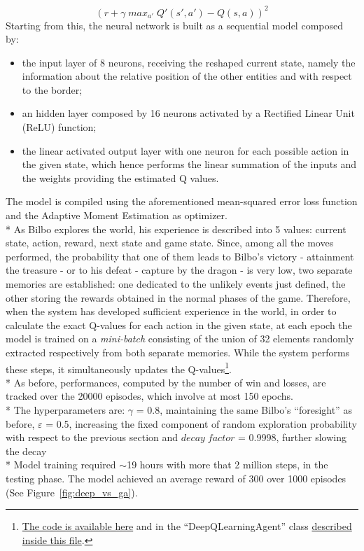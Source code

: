 $$(r+\gamma\;max_{a'}\;Q'(s',a')-Q(s,a))^2$$
Starting from this, the neural network is built as a sequential model composed by:
\begin{itemize}[noitemsep, topsep=0ex]
  \item the input layer of 8 neurons, receiving the reshaped current state, namely the information about the relative position of the other entities and with respect to the border;
  \item an hidden layer composed by 16 neurons activated by a Rectified Linear Unit (ReLU) function; 
  \item the linear activated output layer with one neuron for each possible action in the given state, which hence performs the linear summation of the inputs and the weights providing the estimated Q values.
\end{itemize}
The model is compiled using the aforementioned mean-squared error loss function and the Adaptive Moment Estimation as optimizer.\\*
As Bilbo explores the world, his experience is described into 5 values: current state, action, reward, next state and game state. Since, among all the moves performed, the probability that one of them leads to Bilbo's victory - attainment the treasure - or to his defeat - capture by the dragon - is very low, two separate memories are established: one dedicated to the unlikely events just defined, the other storing the rewards obtained in the normal phases of the game. Therefore, when the system has developed sufficient experience in the world, in order to calculate the exact Q-values for each action in the given state, at each epoch the model is trained on a \textit{mini-batch} consisting of the union of 32 elements randomly extracted respectively from both separate memories. While the system performs these steps, it simultaneously updates the Q-values\footnote{\href{https://github.com/moiraghif/DragonHunting/blob/master/Bilbo\%20World/Bilbo_deep_feels.py}{The code is available here} and in the ``DeepQLearningAgent'' class \href{https://github.com/moiraghif/DragonHunting/blob/master/Bilbo\%20World/agents.py}{described inside this file}.}.\\*
As before, performances, computed by the number of win and losses, are tracked over the 20000 episodes, which involve at most 150 epochs.\\*
The hyperparameters are:
$\gamma$ = 0.8, maintaining the same Bilbo's ``foresight'' as before,
$\varepsilon$ = 0.5, increasing the fixed component of random exploration probability with respect to the previous section and
$decay\;factor$ = 0.9998, further slowing the decay\\*
Model training required $\sim$19 hours with more that 2 million steps, in the testing phase. The model achieved an average reward of 300 over 1000 episodes (See Figure~\ref{fig:deep_vs_ga}).

